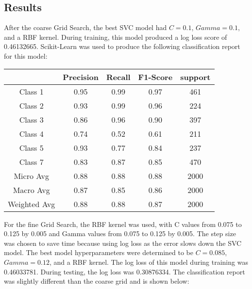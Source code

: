 \documentclass[12pt]{article}
\begin{document}
    \subsection{Results}
    After the coarse Grid Search, the best SVC model had $C = 0.1$, $Gamma = 0.1$, and a RBF kernel. During training, this model produced a log loss score of 0.46132665. Scikit-Learn was used to produce the following classification report for this model:
    \begin{center}
    	\begin{tabular}{| c | c | c | c | c |}
    		\hline
    		& Precision & Recall & F1-Score & support \\ \hline
    		Class 1 & 0.95 & 0.99 & 0.97 & 461 \\ \hline
    		Class 2 & 0.93 & 0.99 & 0.96 & 224 \\ \hline
    		Class 3 & 0.86 & 0.96 & 0.90 & 397 \\ \hline
    		Class 4 & 0.74 & 0.52 & 0.61 & 211 \\ \hline
    		Class 5 & 0.93 & 0.77 & 0.84 & 237 \\ \hline
    		Class 7 & 0.83 & 0.87 & 0.85 & 470 \\ \hline
    		Micro Avg & 0.88 & 0.88 & 0.88 & 2000 \\ \hline
    		Macro Avg & 0.87 & 0.85 & 0.86 & 2000 \\ \hline
    		Weighted Avg & 0.88 & 0.88 & 0.87 & 2000 \\ \hline
    	\end{tabular}
    \end{center}
    For the fine Grid Search, the RBF kernel was used, with C values from 0.075 to 0.125 by 0.005 and Gamma values from 0.075 to 0.125 by 0.005. The step size was chosen to save time because using log loss as the error slows down the SVC model. The best model hyperparameters were determined to be $C = 0.085$, $Gamma = 0.12$, and a RBF kernel. The log loss of this model during training was 0.46033781. During testing, the log loss was 0.30876334. The classification report was slightly different than the coarse grid and is shown below:
\end{document}
